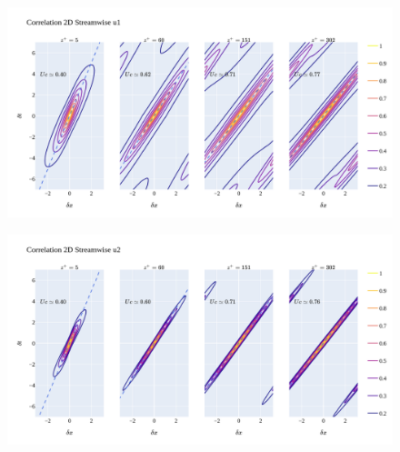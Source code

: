 \documentclass[]{article}
\theoremstyle{plain}
\theoremstyle{remark}
\begin{document}
\begin{figure}[h!]
	\begin{center}
		\includegraphics[width=\textwidth]{../output/channel_wrles_retau395/split_time/frozen_turbulence/correlation2D/u1.png}
		
	\end{center}
\end{figure}

\begin{figure}[h!]
	\begin{center}
		\includegraphics[width=\textwidth]{../output/channel_wrles_retau395/split_time/frozen_turbulence/correlation2D/u2.png}
		
	\end{center}
\end{figure}
\end{document}
